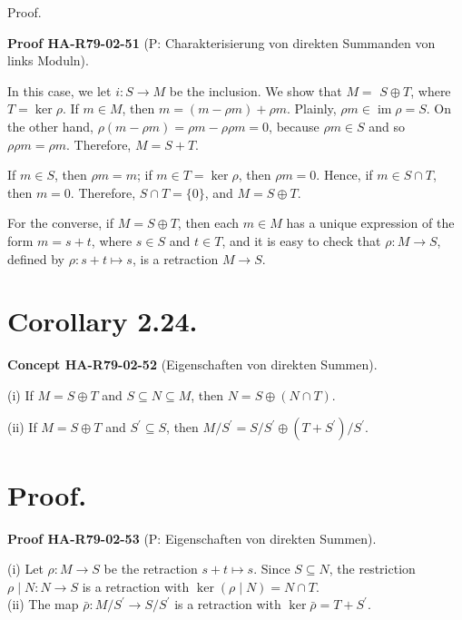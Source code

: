 \documentclass[10pt, letterpaper]{article}
\newcommand{\CustomHeading}[3]{%
  \par\medskip\noindent%
  \textbf{#1 #2} \textnormal{(#3)}.\enskip%
}
\newenvironment{CONC}[2]{\begin{unitbox}\CustomHeading{Concept}{#1}{#2}}{\end{unitbox}}
\newenvironment{PROOF}[2]{\begin{unitbox}\CustomHeading{Proof}{#1}{#2}}{\end{unitbox}}
\begin{document}
Proof. 

\begin{PROOF}{HA-R79-02-51}{P: Charakterisierung von direkten Summanden von links Moduln}
In this case, we let $i: S \rightarrow M$ be the inclusion. We show that $M=$ $S \oplus T$, where $T=\operatorname{ker} \rho$. If $m \in M$, then $m=(m-\rho m)+\rho m$. Plainly, $\rho m \in \operatorname{im} \rho=S$. On the other hand, $\rho(m-\rho m)=\rho m-\rho \rho m=0$, because $\rho m \in S$ and so $\rho \rho m=\rho m$. Therefore, $M=S+T$.

If $m \in S$, then $\rho m=m$; if $m \in T=\operatorname{ker} \rho$, then $\rho m=0$. Hence, if $m \in S \cap T$, then $m=0$. Therefore, $S \cap T=\{0\}$, and $M=S \oplus T$.

For the converse, if $M=S \oplus T$, then each $m \in M$ has a unique expression of the form $m=s+t$, where $s \in S$ and $t \in T$, and it is easy to check that $\rho: M \rightarrow S$, defined by $\rho: s+t \mapsto s$, is a retraction $M \rightarrow S$.
\end{PROOF}




\section*{Corollary 2.24.}

\begin{CONC}{HA-R79-02-52}{Eigenschaften von direkten Summen}
(i) If $M=S \oplus T$ and $S \subseteq N \subseteq M$, then $N=S \oplus(N \cap T)$.

(ii) If $M=S \oplus T$ and $S^{\prime} \subseteq S$, then $M / S^{\prime}=S / S^{\prime} \oplus\left(T+S^{\prime}\right) / S^{\prime}$.
\end{CONC}

\section*{Proof.}

\begin{PROOF}{HA-R79-02-53}{P: Eigenschaften von direkten Summen}
(i) Let $\rho: M \rightarrow S$ be the retraction $s+t \mapsto s$. Since $S \subseteq N$, the restriction $\rho \mid N: N \rightarrow S$ is a retraction with $\operatorname{ker}(\rho \mid N)=N \cap T$.\\

(ii) The map $\bar{\rho}: M / S^{\prime} \rightarrow S / S^{\prime}$ is a retraction with $\operatorname{ker} \bar{\rho}=T+S^{\prime}$.
\end{PROOF}
\end{document}
